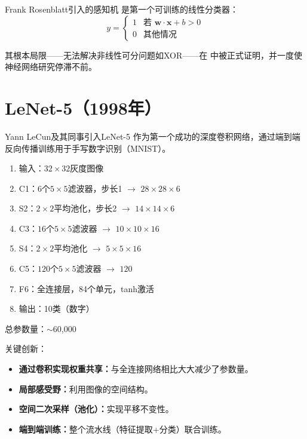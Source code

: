Frank Rosenblatt引入的感知机 \cite{rosenblatt1958perceptron}是第一个可训练的线性分类器：
\begin{equation}
y = \begin{cases} 1 & \text{若 } \mathbf{w} \cdot \mathbf{x} + b > 0 \\ 0 & \text{其他情况} \end{cases}
\end{equation}

其根本局限——无法解决非线性可分问题如XOR——在 \cite{minsky1969perceptrons} 中被正式证明，并一度使神经网络研究停滞不前。

\section{LeNet-5（1998年）}

Yann LeCun及其同事引入LeNet-5 \cite{lecun1998gradient}作为第一个成功的深度卷积网络，通过端到端反向传播训练用于手写数字识别（MNIST）。

\begin{architecture}[LeNet-5架构]
\begin{enumerate}
    \item 输入：$32\times32$灰度图像
    \item C1：$6$个$5\times5$滤波器，步长1 $\rightarrow$ $28\times28\times6$
    \item S2：$2\times2$平均池化，步长2 $\rightarrow$ $14\times14\times6$
    \item C3：$16$个$5\times5$滤波器 $\rightarrow$ $10\times10\times16$
    \item S4：$2\times2$平均池化 $\rightarrow$ $5\times5\times16$
    \item C5：$120$个$5\times5$滤波器 $\rightarrow$ $120$
    \item F6：全连接层，84个单元，tanh激活
    \item 输出：10类（数字）
\end{enumerate}
\end{architecture}

总参数量：$\sim$60{,}000

关键创新：
\begin{itemize}
    \item \textbf{通过卷积实现权重共享：}与全连接网络相比大大减少了参数量。
    \item \textbf{局部感受野：}利用图像的空间结构。
    \item \textbf{空间二次采样（池化）：}实现平移不变性。
    \item \textbf{端到端训练：}整个流水线（特征提取+分类）联合训练。
\end{itemize}

